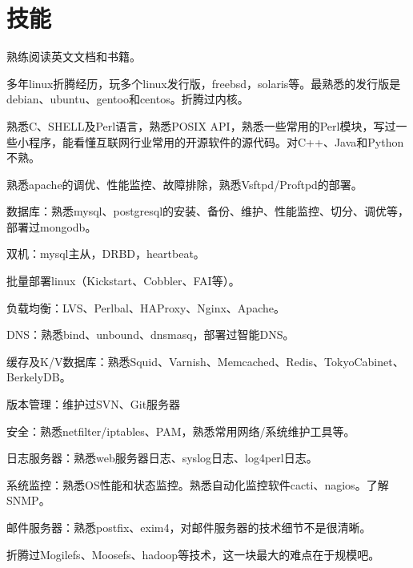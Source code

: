 \documentclass[a4paper,12pt,onecolumn]{article}
\renewenvironment{itemize}{
  \begin{list}{}{
    \setlength{\leftmargin}{1.5em}
    \setlength{\itemsep}{0.25em}
    \setlength{\parskip}{0pt}
    \setlength{\parsep}{0.25em}
  }
}{
  \end{list}
}
\begin{document}
\section{技能}
\begin{itemize}
        \item 熟练阅读英文文档和书籍。
        \item 多年linux折腾经历，玩多个linux发行版，freebsd，solaris等。最熟悉的发行版是debian、ubuntu、gentoo和centos。折腾过内核。
        \item 熟悉C、SHELL及Perl语言，熟悉POSIX API，熟悉一些常用的Perl模块，写过一些小程序，能看懂互联网行业常用的开源软件的源代码。对C++、Java和Python不熟。
        \item 熟悉apache的调优、性能监控、故障排除，熟悉Vsftpd/Proftpd的部署。
        \item 数据库：熟悉mysql、postgresql的安装、备份、维护、性能监控、切分、调优等，部署过mongodb。
        \item 双机：mysql主从，DRBD，heartbeat。
        \item 批量部署linux（Kickstart、Cobbler、FAI等）。
        \item 负载均衡：LVS、Perlbal、HAProxy、Nginx、Apache。
        \item DNS：熟悉bind、unbound、dnsmasq，部署过智能DNS。
        \item 缓存及K/V数据库：熟悉Squid、Varnish、Memcached、Redis、TokyoCabinet、BerkelyDB。
        \item 版本管理：维护过SVN、Git服务器
        \item 安全：熟悉netfilter/iptables、PAM，熟悉常用网络/系统维护工具等。
        \item 日志服务器：熟悉web服务器日志、syslog日志、log4perl日志。
        \item 系统监控：熟悉OS性能和状态监控。熟悉自动化监控软件cacti、nagios。了解SNMP。
        \item 邮件服务器：熟悉postfix、exim4，对邮件服务器的技术细节不是很清晰。
        \item 折腾过Mogilefs、Moosefs、hadoop等技术，这一块最大的难点在于规模吧。
\end{itemize}
\end{document}
